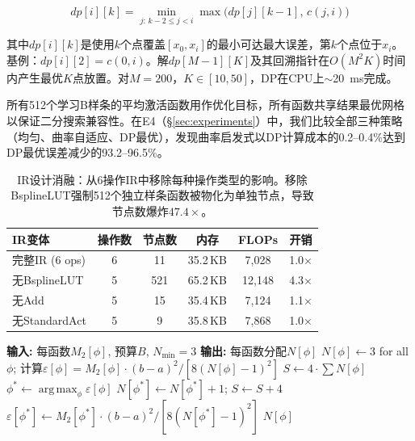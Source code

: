 \documentclass[journal,onecolumn]{IEEEtran}
\DeclareMathOperator*{\argmax}{arg\,max}
\theoremstyle{definition}
\theoremstyle{plain}
\theoremstyle{remark}
\begin{document}
\begin{equation}
dp[i][k] = \min_{j:\,k-2 \leq j < i} \max\big(dp[j][k-1],\,c(j,i)\big)
\label{eq:dp_lut}
\end{equation}

其中$dp[i][k]$是使用$k$个点覆盖$[x_0, x_i]$的最小可达最大误差，第$k$个点位于$x_i$。基例：$dp[i][2] = c(0,i)$。解$dp[M-1][K]$及其回溯指针在$O(M^2K)$时间内产生最优$K$点放置。对$M=200$，$K \in [10,50]$，DP在CPU上$\sim$20~ms完成。

所有512个学习B样条的平均激活函数用作优化目标，所有函数共享结果最优网格以保证二分搜索兼容性。在E4（{\S}\ref{sec:experiments}）中，我们比较全部三种策略（均匀、曲率自适应、DP最优），发现曲率启发式以DP计算成本的0.2--0.4\%达到DP最优误差减少的93.2--96.5\%。

\begin{table}[!t]
\centering
\caption{IR设计消融：从6操作IR中移除每种操作类型的影响。移除BsplineLUT强制512个独立样条函数被物化为单独节点，导致节点数爆炸$47.4\times$。}
\label{tab:ir_ablation}
\small
\begin{tabular}{lccccc}
\toprule
\textbf{IR变体} & \textbf{操作数} & \textbf{节点数} & \textbf{内存} & \textbf{FLOPs} & \textbf{开销} \\
\midrule
完整IR (6 ops) & 6 & 11 & 35.2\,KB & 7{,}028 & 1.0$\times$ \\
无BsplineLUT  & 5 & 521 & 65.2\,KB & 12{,}148 & 4.3$\times$ \\
无Add         & 5 & 15 & 35.4\,KB & 7{,}124 & 1.1$\times$ \\
无StandardAct & 5 & 9 & 35.8\,KB & 7{,}868 & 1.0$\times$ \\
\bottomrule
\end{tabular}
\end{table}

\begin{algorithm}[!t]
\caption{贪心自适应LUT密度分配}
\label{alg:adaptive_lut}
\begin{algorithmic}[1]
\State \textbf{输入:} 每函数$M_2[\phi]$, 预算$B$, $N_{\min}=3$
\State \textbf{输出:} 每函数分配$N[\phi]$
\State $N[\phi] \gets 3$ for all $\phi$; 计算$\varepsilon[\phi] = M_2[\phi]\cdot(b-a)^2/[8(N[\phi]-1)^2]$
\State $S \gets 4\cdot\sum N[\phi]$
    \State $\phi^* \gets \argmax_{\phi} \varepsilon[\phi]$
    \State $N[\phi^*] \gets N[\phi^*] + 1$; $S \gets S + 4$
    \State $\varepsilon[\phi^*] \gets M_2[\phi^*]\cdot(b-a)^2/[8(N[\phi^*]-1)^2]$
\EndWhile
\State \Return $N[\phi]$
\end{algorithmic}
\end{algorithm}
\end{document}
